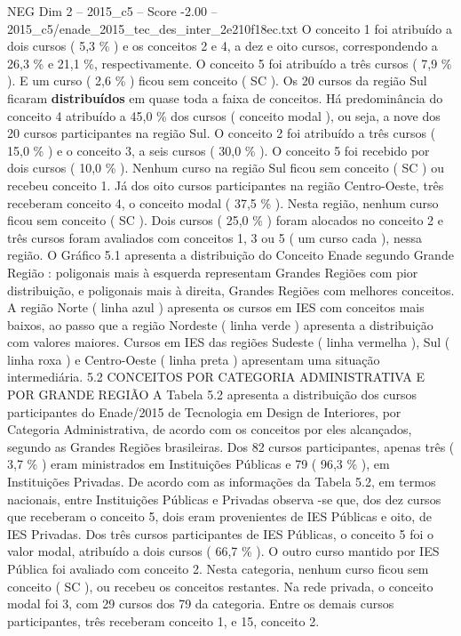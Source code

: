 \begin{textsample}{NEG Dim 2 – 2015\_c5 – Score -2.00 – 2015\_c5/enade\_2015\_tec\_des\_inter\_2e210f18ec.txt}
O conceito 1 foi atribuído a dois cursos ( 5,3 \% ) e os conceitos 2 e 4, a dez e oito cursos, correspondendo a 26,3 \% e 21,1 \%, respectivamente.
O conceito 5 foi atribuído a três cursos ( 7,9 \% ).
E um curso ( 2,6 \% ) ficou sem conceito ( SC ).
Os 20 cursos da região Sul ficaram \textbf{distribuídos} em quase toda a faixa de conceitos.
Há predominância do conceito 4 atribuído a 45,0 \% dos cursos ( conceito modal ), ou seja, a nove dos 20 cursos participantes na região Sul.
O conceito 2 foi atribuído a três cursos ( 15,0 \% ) e o conceito 3, a seis cursos ( 30,0 \% ).
O conceito 5 foi recebido por dois cursos ( 10,0 \% ).
Nenhum curso na região Sul ficou sem conceito ( SC ) ou recebeu conceito 1.
Já dos oito cursos participantes na região Centro-Oeste, três receberam conceito 4, o conceito modal ( 37,5 \% ).
Nesta região, nenhum curso ficou sem conceito ( SC ).
Dois cursos ( 25,0 \% ) foram alocados no conceito 2 e três cursos foram avaliados com conceitos 1, 3 ou 5 ( um curso cada ), nessa região.
O Gráfico 5.1 apresenta a distribuição do Conceito Enade segundo Grande Região : poligonais mais à esquerda representam Grandes Regiões com pior distribuição, e poligonais mais à direita, Grandes Regiões com melhores conceitos.
A região Norte ( linha azul ) apresenta os cursos em IES com conceitos mais baixos, ao passo que a região Nordeste ( linha verde ) apresenta a distribuição com valores maiores.
Cursos em IES das regiões Sudeste ( linha vermelha ), Sul ( linha roxa ) e Centro-Oeste ( linha preta ) apresentam uma situação intermediária. 5.2 CONCEITOS POR CATEGORIA ADMINISTRATIVA E POR GRANDE REGIÃO A Tabela 5.2 apresenta a distribuição dos cursos participantes do Enade/2015 de Tecnologia em Design de Interiores, por Categoria Administrativa, de acordo com os conceitos por eles alcançados, segundo as Grandes Regiões brasileiras.
Dos 82 cursos participantes, apenas três ( 3,7 \% ) eram ministrados em Instituições Públicas e 79 ( 96,3 \% ), em Instituições Privadas.
De acordo com as informações da Tabela 5.2, em termos nacionais, entre Instituições Públicas e Privadas observa -se que, dos dez cursos que receberam o conceito 5, dois eram provenientes de IES Públicas e oito, de IES Privadas.
Dos três cursos participantes de IES Públicas, o conceito 5 foi o valor modal, atribuído a dois cursos ( 66,7 \% ).
O outro curso mantido por IES Pública foi avaliado com conceito 2.
Nesta categoria, nenhum curso ficou sem conceito ( SC ), ou recebeu os conceitos restantes.
Na rede privada, o conceito modal foi 3, com 29 cursos dos 79 da categoria.
Entre os demais cursos participantes, três receberam conceito 1, e 15, conceito 2.

\end{textsample}

